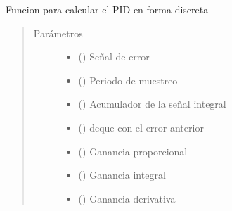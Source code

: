 \documentclass[letterpaper,10pt,spanish]{sphinxmanual}
\begin{document}
\begin{fulllineitems}
\label{\detokenize{codigos/discreto_generator:discreto_generator.PID_discreto}}
Funcion para calcular el PID en forma discreta
\begin{quote}\begin{description}
\item[{Parámetros}] \leavevmode\begin{itemize}
\item {} 
 () \textendash{} Señal de error

\item {} 
 () \textendash{} Periodo de muestreo

\item {} 
 () \textendash{} Acumulador de la señal integral

\item {} 
 () \textendash{} deque con el error anterior

\item {} 
 () \textendash{} Ganancia proporcional

\item {} 
 () \textendash{} Ganancia integral

\item {} 
 () \textendash{} Ganancia derivativa

\end{itemize}

\end{description}\end{quote}

\end{fulllineitems}
\end{document}
